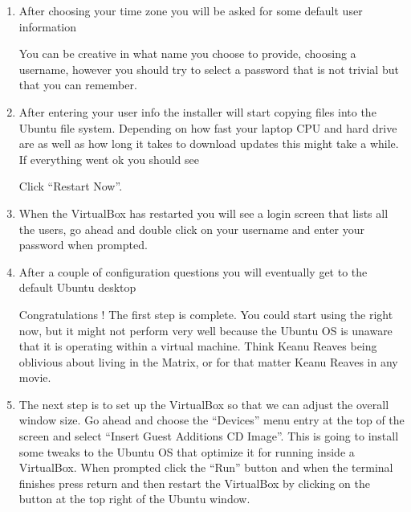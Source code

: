 \begin{enumerate}[start=1,label={\bfseries Step \#\arabic*:}]
    
    If the installation is actually happening inside a VirtualBox it is asking if you want to erase your virtual hard drive. That is not so scary, since it is just a file on your physical laptop hard drive. So if you are doing this inside VirtualBox then go ahead and choose that option then click ``Install Now'' and confirm that you want to change the disk.
    
    \item After choosing your time zone you will be asked for some default user information
    
    
    You can be creative in what name you choose to provide, choosing a username, however you should try to select a password that is not trivial but that you can remember.
    
    \item After entering your user info the installer will start copying files into the Ubuntu file system. Depending on how fast your laptop CPU and hard drive are as well as how long it takes to download updates this might take a while. If everything went ok you should see
    
     
    Click ``Restart Now''. 
    
    \item When the VirtualBox has restarted you will see a login screen that lists all the users, go ahead and double click on your username and enter your password when prompted.
    
    
    \item After a couple of configuration questions you will eventually get to the default Ubuntu desktop
    
    
    Congratulations ! The first step is complete. You could start using the \VB right now, but it might not perform very well because the Ubuntu OS is unaware that it is operating within a virtual machine. Think Keanu Reaves being oblivious about living in the Matrix, or for that matter Keanu Reaves in any movie.
    
    \item The next step is to set up the VirtualBox so that we can adjust the overall window size. Go ahead and choose the ``Devices'' menu entry at the top of the screen and select ``Insert Guest Additions CD Image''. This is going to install some tweaks to the Ubuntu OS that optimize it for running inside a VirtualBox. When prompted click the ``Run'' button and when the terminal finishes press return and then restart the VirtualBox by clicking on the button at the top right of the Ubuntu window.
    

\end{enumerate}
